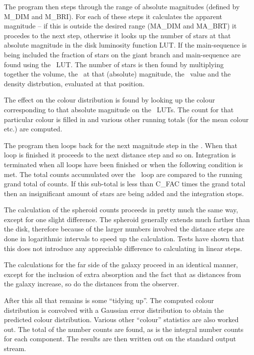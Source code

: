 The program then steps through the range of absolute magnitudes (defined
by M\_DIM and M\_BRI). For each of these steps it calculates the apparent
magnitude -- if this is outside the desired range (MA\_DIM and MA\_BRT)
it procedes to the next step, otherwise it looks up the number of
stars at that absolute magnitude in the disk luminosity function LUT.
If the main-sequence is being included the fraction of stars on the
giant branch and main-sequence are found using the \fms\ LUT.
The number of stars is then found by multiplying
together the volume, the \lf\ at that (absolute) magnitude, the
\fms\ value and the density distrbution, evaluated at that position.

The effect on the colour distribution is found by looking up the colour
corresponding to that absolute magnitude on the \cmd\ LUTs. The count
for that particular colour is filled in and various other running totals
(for the mean colour etc.) are computed.

The program then loops back for the next magnitude step in the \lf.
When that loop is finished it proceeds to the next distance step and so on.
Integration is terminated when all loops have been finished or when
the following condition is met. The total counts accumulated over the
\lf\ loop are compared to the running grand total of counts. If this 
sub-total is less than C\_FAC times the grand total then an insignificant
amount of stars are being added and the integration stops.

The calculation of the spheroid counts proceeds in pretty much the same way,
except for one slight difference. The spheroid generally extends much farther
than the disk, therefore because of the larger numbers involved the
distance steps are done in logarithmic intervals to speed up the calculation.
Tests have shown that this does not introduce any appreciable difference to
calculating in linear steps.

The calculations for the far side of the galaxy proceed in an identical
manner, except for the inclusion of extra absorption and the fact that as
distances from the galaxy increase, so do the distances from the observer.

After this all that remains is some ``tidying up''. The computed colour
distribution is convolved with a Gaussian error distribution to obtain the 
predicted colour distribution. Various other ``colour'' statistics are also
worked out. The total of the number counts are found, as is the integral
number counts for each component.
The results are then written out on the standard output stream.


